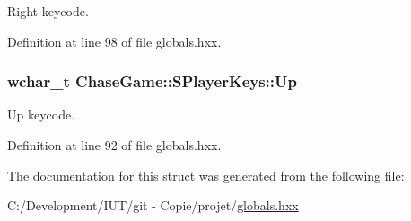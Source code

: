 Right keycode. 



Definition at line 98 of file globals.\-hxx.

\hypertarget{struct_chase_game_1_1_s_player_keys_a0153d90bee31d3959e7a79377c4dd927}{
\subsubsection[{Up}]{\setlength{\rightskip}{0pt plus 5cm}wchar\-\_\-t Chase\-Game\-::\-S\-Player\-Keys\-::\-Up}}\label{struct_chase_game_1_1_s_player_keys_a0153d90bee31d3959e7a79377c4dd927}


Up keycode. 



Definition at line 92 of file globals.\-hxx.



The documentation for this struct was generated from the following file\-:\begin{DoxyCompactItemize}
\item 
C\-:/\-Development/\-I\-U\-T/git -\/ Copie/projet/\hyperlink{globals_8hxx}{globals.\-hxx}\end{DoxyCompactItemize}

